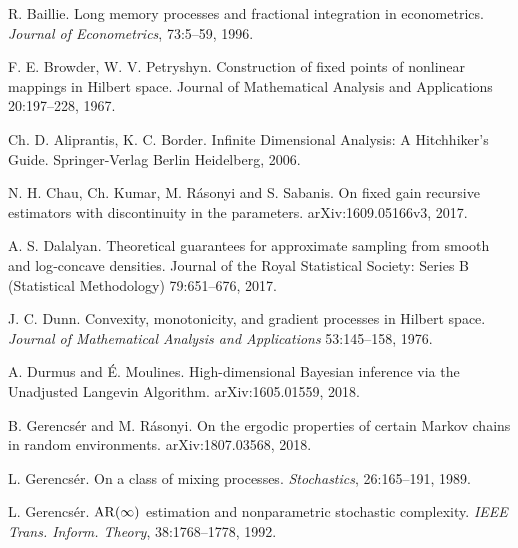 \documentclass[a4paper]{article}
\begin{document}
\begin{thebibliography}{00}

 R. Baillie.
\newblock Long memory processes and fractional integration in econometrics.
\newblock\emph{Journal of Econometrics}, 73:5--59, 1996.

 F. E.	Browder, W. V. Petryshyn. \newblock Construction of fixed points of nonlinear mappings in Hilbert space.
\newblock Journal of Mathematical Analysis and Applications 20:197--228, 1967.

 Ch. D. Aliprantis, K. C. Border.
\newblock Infinite Dimensional Analysis: A Hitchhiker's Guide.
\newblock Springer-Verlag Berlin Heidelberg, 2006.

 N. H. Chau, Ch. Kumar, M. R\'asonyi and S. Sabanis.
\newblock On fixed gain recursive estimators with discontinuity in the parameters.
\newblock arXiv:1609.05166v3, 2017.

 A. S. Dalalyan.
\newblock Theoretical guarantees for approximate sampling from smooth and log‐concave densities.
\newblock Journal of the Royal Statistical Society: Series B (Statistical Methodology) 79:651--676, 2017.

 J. C. Dunn.
\newblock Convexity, monotonicity, and gradient processes in Hilbert space.
\newblock \emph{Journal of Mathematical Analysis and Applications} 53:145--158, 1976.

 A. Durmus and \'E. Moulines.
\newblock High-dimensional Bayesian inference via the Unadjusted
Langevin Algorithm.
\newblock arXiv:1605.01559, 2018.

 B. Gerencs\'er and M. R\'asonyi.
\newblock On the ergodic properties of certain Markov chains in
random environments.
\newblock arXiv:1807.03568, 2018.




 L. Gerencs\'er.
\newblock On a class of mixing processes.
\newblock \emph{Stochastics},  26:165--191, 1989.

{L. Gerencs{\'e}r.} {{${\rm AR}(\infty)$} estimation and nonparametric stochastic
	complexity}.
\newblock\emph{IEEE Trans. Inform. Theory}, 38:1768--1778, 1992.


\end{thebibliography}
\end{document}
